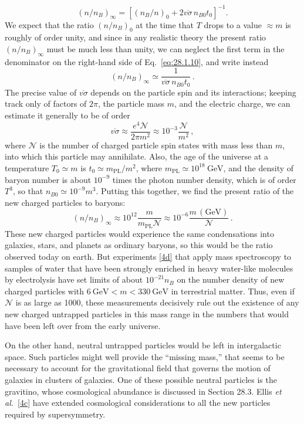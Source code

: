 \begin{equation}
  (n/n_B)_\infty
  =\left[(n_B/n)_0+2\overline{v\sigma}\,n_{B0}t_0\right]^{-1}.
  \tag{28.1.10}\label{eq:28.1.10}
\end{equation}
We expect that the ratio \((n/n_B)_0\) at the time that \(T\) drops to a
value \(\approx m\) is roughly of order unity, and since in any realistic
theory the present ratio \((n/n_B)_\infty\) must be much less than unity,
we can neglect the first term in the denominator on the right-hand side
of Eq.~\eqref{eq:28.1.10}, and write instead
\begin{equation}
  (n/n_B)_\infty
  \simeq\frac{1}{\overline{v\sigma}\,n_{B0}t_0}\,.
  \tag{28.1.11}\label{eq:28.1.11}
\end{equation}
The precise value of \(\overline{v\sigma}\) depends on the particle spin
and its interactions; keeping track only of factors of \(2\pi\), the
particle mass \(m\), and the electric charge, we can estimate it
generally to be of order
\begin{equation}
  \overline{v\sigma}
  \approx\frac{e^4\mathcal{N}}{2\pi m^2}
  \approx10^{-3}\frac{\mathcal{N}}{m^2}\,,
  \tag{28.1.12}\label{eq:28.1.12}
\end{equation}
where \(\mathcal{N}\) is the number of charged particle spin states with
mass less than \(m\), into which this particle may annihilate. Also, the
age of the universe at a temperature \(T_0\simeq m\) is
\(t_0\simeq m_{\mathrm{PL}}/m^2\), where
\(m_{\mathrm{PL}}\simeq10^{18}\ \mathrm{GeV}\), and the density of
baryon number is about \(10^{-9}\) times the photon number density,
which is of order \(T^3\), so that \(n_{B0}\simeq10^{-9}m^3\). Putting
this together, we find the present ratio of the new charged particles
to baryons:
\begin{equation}
  (n/n_B)_\infty
  \approx10^{12}\frac{m}{m_{\mathrm{PL}}\mathcal{N}}
  \approx10^{-6}\frac{m\,(\mathrm{GeV})}{\mathcal{N}}\,.
  \tag{28.1.13}\label{eq:28.1.13}
\end{equation}
These new charged particles would experience the same condensations into
galaxies, stars, and planets as ordinary baryons, so this would be the
ratio observed today on earth. But experiments
\hyperref[ch28-ref-4d]{[4d]} that apply mass spectroscopy to samples of
water that have been strongly enriched in heavy water-like molecules by
electrolysis have set limits of about \(10^{-21}n_B\) on the number
density of new charged particles with
\(6\ \mathrm{GeV}<m<330\ \mathrm{GeV}\) in terrestrial matter. Thus,
even if \(\mathcal{N}\) is as large as 1000, these measurements
decisively rule out the existence of any new charged untrapped particles
in this mass range in the numbers that would have been left over from
the early universe.

On the other hand, neutral untrapped particles would be left in
intergalactic space. Such particles might well provide the ``missing
mass,'' that seems to be necessary to account for the gravitational
field that governs the motion of galaxies in clusters of galaxies. One
of these possible neutral particles is the gravitino, whose cosmological
abundance is discussed in Section 28.3. Ellis \textit{et al.}\
\hyperref[ch28-ref-4c]{[4c]} have extended cosmological considerations
to all the new particles required by supersymmetry.
